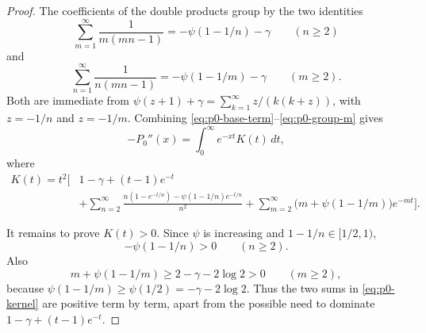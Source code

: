 \documentclass[11pt]{article}
\numberwithin{equation}{section}
\theoremstyle{definition}
\theoremstyle{remark}
\newcommand{\1}{\mathbf 1}
\begin{document}
\begin{proof}
The coefficients of the double products group by the two identities
\begin{equation}
\label{eq:p0-group-n}
\sum_{m=1}^{\infty}\frac1{m(mn-1)}
=-\psi(1-1/n)-\gamma
\qquad(n\ge2)
\end{equation}
and
\begin{equation}
\label{eq:p0-group-m}
\sum_{n=1}^{\infty}\frac1{n(mn-1)}
=-\psi(1-1/m)-\gamma
\qquad(m\ge2).
\end{equation}
Both are immediate from \(\psi(z+1)+\gamma=\sum_{k=1}^\infty z/(k(k+z))\), with \(z=-1/n\) and \(z=-1/m\).  Combining \eqref{eq:p0-base-term}--\eqref{eq:p0-group-m} gives
\begin{equation}
\label{eq:p0-laplace-kernel-representation}
-P_0''(x)=\int_0^\infty e^{-xt}K(t)\,dt,
\end{equation}
where
\begin{equation}
\label{eq:p0-kernel}
\begin{aligned}
K(t)=t^2\Bigg[
&1-\gamma+(t-1)e^{-t}\\
&+\sum_{n=2}^{\infty}
\frac{n(1-e^{-t/n})-\psi(1-1/n)e^{-t/n}}{n^2}
+\sum_{m=2}^{\infty}\bigl(m+\psi(1-1/m)\bigr)e^{-mt}
\Bigg].
\end{aligned}
\end{equation}

It remains to prove \(K(t)>0\).  Since \(\psi\) is increasing and \(1-1/n\in[1/2,1)\),
\begin{equation}
\label{eq:p0-minus-psi-positive}
-\psi(1-1/n)>0\qquad(n\ge2).
\end{equation}
Also
\begin{equation}
\label{eq:p0-m-sum-positive}
m+\psi(1-1/m)\ge 2-\gamma-2\log2>0
\qquad(m\ge2),
\end{equation}
because \(\psi(1-1/m)\ge\psi(1/2)=-\gamma-2\log2\).  Thus the two sums in \eqref{eq:p0-kernel} are positive term by term, apart from the possible need to dominate \(1-\gamma+(t-1)e^{-t}\).


\end{proof}
\end{document}
